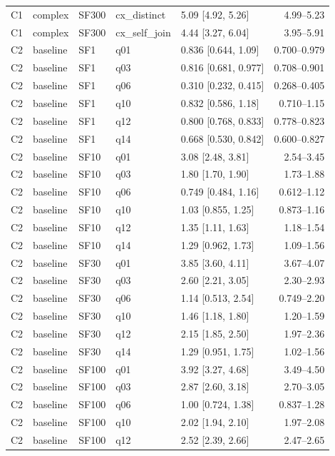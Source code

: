 \begin{longtable}{lllllr}
C1 & complex & SF300 & cx\_distinct & 5.09 [4.92, 5.26] & 4.99--5.23 \\
C1 & complex & SF300 & cx\_self\_join & 4.44 [3.27, 6.04] & 3.95--5.91 \\
C2 & baseline & SF1 & q01 & 0.836 [0.644, 1.09] & 0.700--0.979 \\
C2 & baseline & SF1 & q03 & 0.816 [0.681, 0.977] & 0.708--0.901 \\
C2 & baseline & SF1 & q06 & 0.310 [0.232, 0.415] & 0.268--0.405 \\
C2 & baseline & SF1 & q10 & 0.832 [0.586, 1.18] & 0.710--1.15 \\
C2 & baseline & SF1 & q12 & 0.800 [0.768, 0.833] & 0.778--0.823 \\
C2 & baseline & SF1 & q14 & 0.668 [0.530, 0.842] & 0.600--0.827 \\
C2 & baseline & SF10 & q01 & 3.08 [2.48, 3.81] & 2.54--3.45 \\
C2 & baseline & SF10 & q03 & 1.80 [1.70, 1.90] & 1.73--1.88 \\
C2 & baseline & SF10 & q06 & 0.749 [0.484, 1.16] & 0.612--1.12 \\
C2 & baseline & SF10 & q10 & 1.03 [0.855, 1.25] & 0.873--1.16 \\
C2 & baseline & SF10 & q12 & 1.35 [1.11, 1.63] & 1.18--1.54 \\
C2 & baseline & SF10 & q14 & 1.29 [0.962, 1.73] & 1.09--1.56 \\
C2 & baseline & SF30 & q01 & 3.85 [3.60, 4.11] & 3.67--4.07 \\
C2 & baseline & SF30 & q03 & 2.60 [2.21, 3.05] & 2.30--2.93 \\
C2 & baseline & SF30 & q06 & 1.14 [0.513, 2.54] & 0.749--2.20 \\
C2 & baseline & SF30 & q10 & 1.46 [1.18, 1.80] & 1.20--1.59 \\
C2 & baseline & SF30 & q12 & 2.15 [1.85, 2.50] & 1.97--2.36 \\
C2 & baseline & SF30 & q14 & 1.29 [0.951, 1.75] & 1.02--1.56 \\
C2 & baseline & SF100 & q01 & 3.92 [3.27, 4.68] & 3.49--4.50 \\
C2 & baseline & SF100 & q03 & 2.87 [2.60, 3.18] & 2.70--3.05 \\
C2 & baseline & SF100 & q06 & 1.00 [0.724, 1.38] & 0.837--1.28 \\
C2 & baseline & SF100 & q10 & 2.02 [1.94, 2.10] & 1.97--2.08 \\
C2 & baseline & SF100 & q12 & 2.52 [2.39, 2.66] & 2.47--2.65 \\

\end{longtable}
